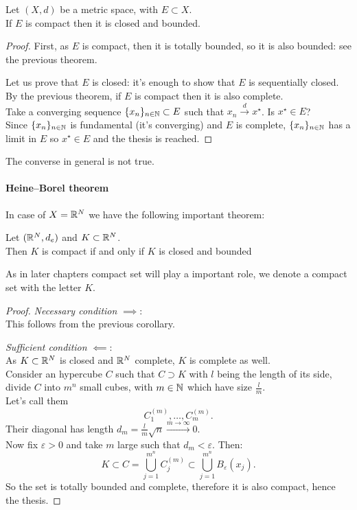\begin{coro}
	Let $(X,d)$ be a metric space, with $E \subset X$.\\
	If $E$ is compact then it is closed and bounded.
\end{coro}

\begin{proof}
	First, as $E$ is compact, then it is totally bounded, so it is also bounded: see the previous theorem.
	
	Let us prove that $E$ is closed: it's enough to show that $E$ is sequentially closed.\\
	By the previous theorem, if $E$ is compact then it is also complete.\\
	Take a converging sequence $\{x_n\}_{n\in \mathbb N} \subset E$ such that $x_n \xrightarrow{d} x^\star$. Is $x^\star \in E$?\\
	Since $\{x_n\}_{n\in \mathbb N}$ is fundamental (it's converging) and $E$ is complete, $\{x_n\}_{n\in \mathbb N}$ has a limit in $E$ so $x^\star \in E$ and the thesis is reached.
\end{proof}

The converse in general is not true.

\paragraph{Heine--Borel theorem} In case of $X=\mathbb R^N$ we have the following important theorem:

\begin{theo}\label{heine-borel-theo}
	Let $(\mathbb R^N, d_e)$ and $K \subset \mathbb R^N$. \\
	Then $K$ is compact if and only if $K$ is closed and bounded
\end{theo}
As in later chapters compact set will play a important role, we denote a compact set with the letter $K$.

\begin{proof}
	\textit{Necessary condition} $\implies$:\\
	This follows from the previous corollary.
	
	\textit{Sufficient condition} $\impliedby$:\\
	As $K\subset \mathbb R^N$ is closed and $\mathbb R^N$ complete, $K$ is complete as well.\\
	Consider an hypercube $C$ such that $C\supset K$ with $l$ being the length of its side, divide $C$ into $m^n$ small cubes, with $m \in \mathbb N$ which have size $\frac l m$.\\
	Let's call them 
	$$
		C_1^{(m)}, \ldots , C_m^{(m)}
	.
	$$
	Their diagonal has length $d_m = \frac l m \sqrt{n}\xrightarrow{m\to\infty}0$.\\
	Now fix $\varepsilon>0$ and take $m$ large such that $d_m < \varepsilon$. Then:
	$$
		K 
		\subset C 
		= \bigcup_{j=1}^{m^n} C_j^{(m)}
		\subset \bigcup_{j=1}^{m^n} B_\varepsilon(x_j)
	.
	$$
	So the set is totally bounded and complete, therefore it is also compact, hence the thesis.
\end{proof}

